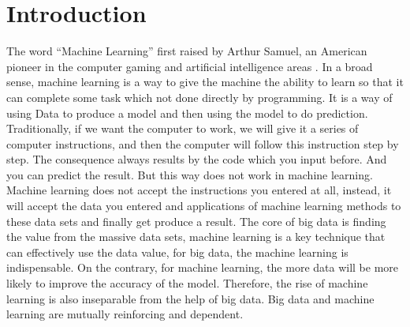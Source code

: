 \documentclass[sigconf]{acmart}
\begin{document}
\section{Introduction}
The word ``Machine Learning'' first raised by Arthur Samuel, an American pioneer in the computer gaming and artificial intelligence areas \cite{Kohavi1}. In a broad sense, machine learning is a way to give the machine the ability to learn so that it can complete some task which not done directly by programming. It is a way of using Data to produce a model and then using the model to do prediction. Traditionally, if we want the computer to work, we will give it a series of computer instructions, and then the computer will follow this instruction step by step. The consequence always results by the code which you input before. And you can predict the result. But this way does not work in machine learning. Machine learning does not accept the instructions you entered at all, instead, it will accept the data you entered and applications of machine learning methods to these data sets and finally get produce a result. The core of big data is finding the value from the massive data sets, machine learning is a key technique that can effectively use the data value, for big data, the machine learning is indispensable. On the contrary, for machine learning, the more data will be more likely to improve the accuracy of the model. Therefore, the rise of machine learning is also inseparable from the help of big data. Big data and machine learning are mutually reinforcing and dependent.
\end{document}
